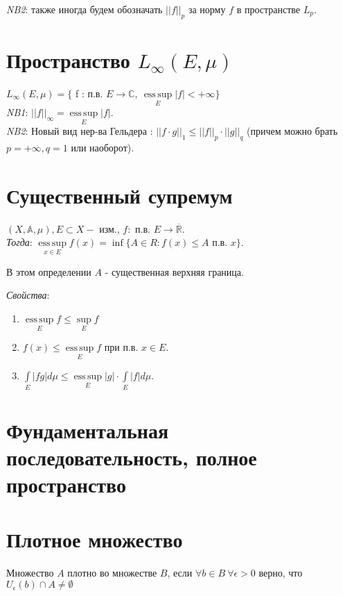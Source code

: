 \documentclass[paper=a4, fontsize=17pt]{article}
\DeclareMathOperator*{\esssup}{ess\, sup}
\begin{document}
	\emph{NB2}: также иногда будем обозначать $||f||_p$ за норму $f$ в пространстве $L_p$.
	
	\section{Пространство $L_{\infty}(E,\mu)$}
	$L_\infty(E, \mu) =\{$ f : п.в. $E \rightarrow \mathbb{C},\ \esssup\limits_E |f| < +\infty \}$\\
	\emph{NB1}: $||f||_\infty = \esssup\limits_E |f|$.\\
	
	\emph{NB2}: Новый вид нер-ва Гельдера : $||f \cdot g||_1 \leq ||f||_p \cdot ||g||_q$ (причем можно брать $p = +\infty, q = 1$ или наоборот).
	
	\section{Существенный супремум}
	$(X, \mathds{A}, \mu), E \subset X - $ изм., $f : $ п.в. $E \rightarrow \overline{\mathbb{R}}$.\\
	
	\emph{Тогда}: $\esssup\limits_{x \in E} f(x) = \inf \{A \in R : f(x) \leq A$ п.в. $x \}$. 
	
	В этом определении $A$ - существенная верхняя граница. 
	
	\emph{Свойства}:
	\begin{enumerate}
		\item
		$\esssup\limits_E f \leq \sup\limits_E f$
		
		\item
		$f(x) \leq \esssup\limits_E f$ при п.в. $x \in E$.
		
		\item
		$\int\limits_E |fg|d\mu \leq \esssup\limits_E |g| \cdot \int\limits_E |f|d\mu$.
	\end{enumerate}
	
	\section{Фундаментальная последовательность, полное пространство}
	
	\section{Плотное множество}
	Множество $A$ плотно во множестве $B$, если $\forall b \in B \  \forall \epsilon > 0$ верно, что $U_\epsilon(b) \cap A \neq \emptyset$
 
\end{document}
